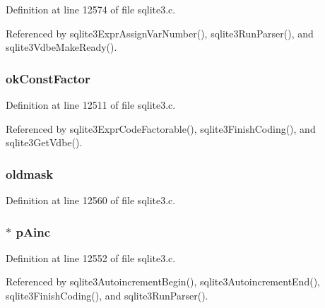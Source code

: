 Definition at line 12574 of file sqlite3.\+c.



Referenced by sqlite3\+Expr\+Assign\+Var\+Number(), sqlite3\+Run\+Parser(), and sqlite3\+Vdbe\+Make\+Ready().

\hypertarget{struct_parse_ac2d1b74cf6f7d0a3b0036997b6cb1051}{}
\subsubsection[{ok\+Const\+Factor}]{ ok\+Const\+Factor}\label{struct_parse_ac2d1b74cf6f7d0a3b0036997b6cb1051}


Definition at line 12511 of file sqlite3.\+c.



Referenced by sqlite3\+Expr\+Code\+Factorable(), sqlite3\+Finish\+Coding(), and sqlite3\+Get\+Vdbe().

\hypertarget{struct_parse_a5570817d80b8691fbc101651329665c2}{}
\subsubsection[{oldmask}]{ oldmask}\label{struct_parse_a5570817d80b8691fbc101651329665c2}


Definition at line 12560 of file sqlite3.\+c.

\hypertarget{struct_parse_af29cefdbafae7365c8fc16b81766a646}{}
\subsubsection[{p\+Ainc}]{$\ast$ p\+Ainc}\label{struct_parse_af29cefdbafae7365c8fc16b81766a646}


Definition at line 12552 of file sqlite3.\+c.



Referenced by sqlite3\+Autoincrement\+Begin(), sqlite3\+Autoincrement\+End(), sqlite3\+Finish\+Coding(), and sqlite3\+Run\+Parser().

\hypertarget{struct_parse_a15a4706ea881fbe875ab67f3ebd5f952}{}
